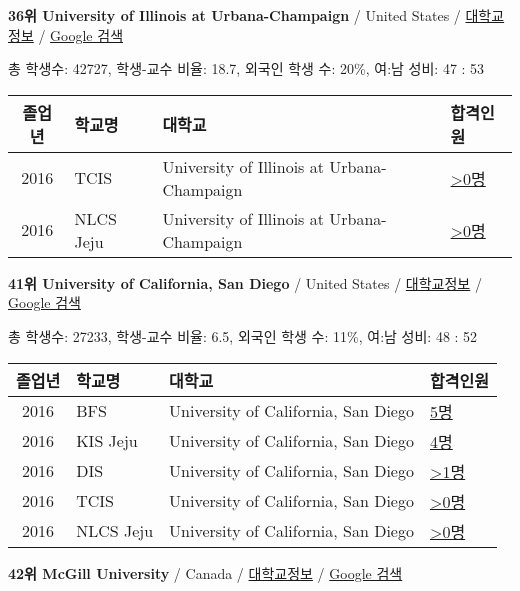 \documentclass[13pt,]{article}
\begin{document}
\textbf{36위 University of Illinois at Urbana-Champaign} / United States
/
\href{https://www.timeshighereducation.com/world-university-rankings/university-of-illinois-at-urbana-champaign?ranking-dataset=589595}{대학교정보}
/
\href{http://www.google.com/search?q=University+of+Illinois+at+Urbana-Champaign}{Google
검색}

총 학생수: 42727, 학생-교수 비율: 18.7, 외국인 학생 수: 20\%, 여:남
성비: 47 : 53

\begin{longtable}[]{@{}clll@{}}
\toprule
졸업년 & 학교명 & 대학교 & 합격인원\tabularnewline
\midrule
\endhead
2016 & TCIS & University of Illinois at Urbana-Champaign &
\href{http://cafe.naver.com/assarabia/11598}{\textgreater{}0명}\tabularnewline
2016 & NLCS Jeju & University of Illinois at Urbana-Champaign &
\href{http://cafe.naver.com/assarabia/11592}{\textgreater{}0명}\tabularnewline
\bottomrule
\end{longtable}

\textbf{41위 University of California, San Diego} / United States /
\href{https://www.timeshighereducation.com/world-university-rankings/university-of-california-san-diego?ranking-dataset=589595}{대학교정보}
/
\href{http://www.google.com/search?q=University+of+California,+San+Diego}{Google
검색}

총 학생수: 27233, 학생-교수 비율: 6.5, 외국인 학생 수: 11\%, 여:남 성비:
48 : 52

\begin{longtable}[]{@{}clll@{}}
\toprule
졸업년 & 학교명 & 대학교 & 합격인원\tabularnewline
\midrule
\endhead
2016 & BFS & University of California, San Diego &
\href{http://cafe.naver.com/assarabia/11597}{5명}\tabularnewline
2016 & KIS Jeju & University of California, San Diego &
\href{http://cafe.naver.com/assarabia/11596}{4명}\tabularnewline
2016 & DIS & University of California, San Diego &
\href{http://cafe.naver.com/assarabia/11591}{\textgreater{}1명}\tabularnewline
2016 & TCIS & University of California, San Diego &
\href{http://cafe.naver.com/assarabia/11598}{\textgreater{}0명}\tabularnewline
2016 & NLCS Jeju & University of California, San Diego &
\href{http://cafe.naver.com/assarabia/11592}{\textgreater{}0명}\tabularnewline
\bottomrule
\end{longtable}

\textbf{42위 McGill University} / Canada /
\href{https://www.timeshighereducation.com/world-university-rankings/mcgill-university?ranking-dataset=589595}{대학교정보}
/ \href{http://www.google.com/search?q=McGill+University}{Google 검색}
\end{document}
